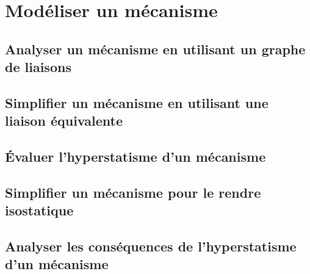 \setchapterpreamble[u]{\margintoc} 
\chapter{Modéliser un mécanisme} 
\section{Analyser un mécanisme en utilisant un graphe de liaisons} 
\section{Simplifier un mécanisme en utilisant une liaison équivalente} 
\section{Évaluer l'hyperstatisme d'un mécanisme} 
\graphicspath{{\repStyle/png/}{../CHS/CHS-03-HS/64_EPAS/images/}} 
 
 
\graphicspath{{\repStyle/png/}{../CHS/CHS-03-HS/69_TrainA350/images/}} 
 
 
\graphicspath{{\repStyle/png/}{../CHS/CHS-03-HS/71_Robovolc/images/}} 
 
 
\graphicspath{{\repStyle/png/}{../CHS/CHS-03-HS/71_Robovolc_02/images/}} 
 
 
\graphicspath{{\repStyle/png/}{../CHS/CHS-03-HS/72_Tripteor/images/}} 
 
 
\graphicspath{{\repStyle/png/}{../CHS/CHS-03-HS/81_Piaggio/images/}} 
 
 
\graphicspath{{\repStyle/png/}{../CHS/CHS-03-HS/82_MAV/images/}} 
 
 
\graphicspath{{\repStyle/png/}{../CHS/CHS-03-HS/83_Roburoc/images/}} 
 
 
\graphicspath{{\repStyle/png/}{../CHS/CHS-03-HS/84_Nacelle/images/}} 
 
 
\section{Simplifier un mécanisme pour le rendre isostatique} 
\section{Analyser les conséquences de l'hyperstatisme d'un mécanisme} 
